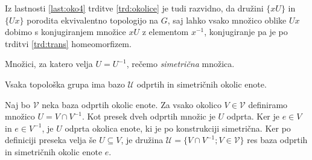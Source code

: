 \documentclass[mat1]{fmfdelo}
\newcommand{\Ucurl}{\mathcal{U}}
\newcommand{\closure}[1]{\overline{#1}}
\begin{document}
\begin{dokaz}
Iz lastnosti \ref{last:oko4} trditve \ref{trd:okolice} je tudi razvidno, da družini $\lbrace xU \rbrace$ in $\lbrace Ux \rbrace$ porodita ekvivalentno topologijo na $G$, saj lahko vsako množico oblike $Ux$ dobimo s konjugiranjem množice $xU$ z elementom $x^{-1}$, konjugiranje pa je po trditvi \ref{trd:trans} homeomorfizem.
\end{dokaz}

\begin{definicija}\label{def:sim}
Množici, za katero velja $U = U^{-1}$, rečemo \emph{simetrična} množica.
\end{definicija}

\begin{trditev}\label{trd:sim}
Vsaka topološka grupa ima bazo $\Ucurl$ odprtih in simetričnih okolic enote.
\end{trditev}

\begin{dokaz}
Naj bo $\mathcal{V}$ neka baza odprtih okolic enote. Za vsako okolico $V \in \mathcal{V}$ definiramo množico $U = V \cap V^{-1}$. Kot presek dveh odprtih množic je $U$ odprta. Ker je $e \in V$ in $e \in V^{-1}$, je $U$ odprta okolica enote, ki je po konstrukciji simetrična. Ker po definiciji preseka velja še $U \subseteq V$, je družina $\Ucurl = \lbrace V \cap V^{-1}; V \in \mathcal{V} \rbrace$ res baza odprtih in simetričnih okolic enote $e$.
\end{dokaz}

%
%
\end{document}
